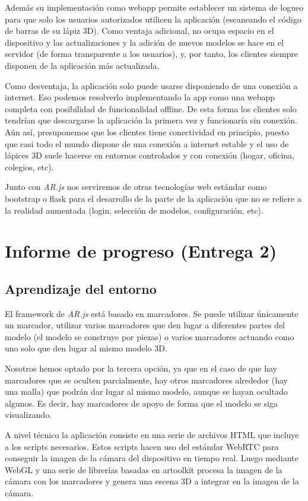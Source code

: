 \documentclass[12pt,a4paper]{article}
\begin{document}
Además su implementación como webapp permite establecer un sistema de logueo para que solo los usuarios autorizados utilicen la aplicación (escaneando el código de barras de su lápiz 3D). Como ventaja adicional, no ocupa espacio en el dispositivo y las actualizaciones y la adición de nuevos modelos se hace en el servidor (de forma transparente a los usuarios), y, por tanto, los clientes siempre disponen de la aplicación más actualizada. 

Como desventaja, la aplicación solo puede usarse disponiendo de una conexión a internet. Eso podemos resolverlo implementando la app como una webapp completa con posibilidad de funcionalidad offline. De esta forma los clientes solo tendrían que descargarse la aplicación la primera vez y funcionaría sin conexión. Aún así, presuponemos que los clientes tiene conectividad en principio, puesto que casi todo el mundo dispone de una conexión a internet estable y el uso de lápices 3D suele hacerse en entornos controlados y con conexión (hogar, oficina, colegios, etc).

Junto con \textit{AR.js} nos serviremos de otras tecnologías web estándar como bootstrap o flask para el desarrollo de la parte de la aplicación que no se refiere a la realidad aumentada (login, selección de modelos, configuración, etc).


\section{Informe de progreso (Entrega 2)}

\subsection{Aprendizaje del entorno}

El framework de \textit{AR.js} está basado en marcadores. Se puede utilizar únicamente un marcador, utilizar varios marcadores que den lugar a diferentes partes del modelo (el modelo se construye por piezas) o varios marcadores actuando como uno solo que den lugar al mismo modelo 3D.

Nosotros hemos optado por la tercera opción, ya que en el caso de que hay marcadores que se oculten parcialmente, hay otros marcadores alrededor (hay una malla) que podrán dar lugar al mismo modelo, aunque se hayan ocultado algunos. Es decir, hay marcadores de apoyo de forma que el modelo se siga visualizando.

A nivel técnico la aplicación consiste en una serie de archivos HTML que incluye a los scripts necesarios. Estos scripts hacen uso del estándar WebRTC para conseguir la imagen de la cámara del dispositivo en tiempo real. Luego mediante WebGL y una serie de librerías basadas en artoolkit procesa la imagen de la cámara con los marcadores y genera una escena 3D a integrar en la imagen de la cámara.
\end{document}
